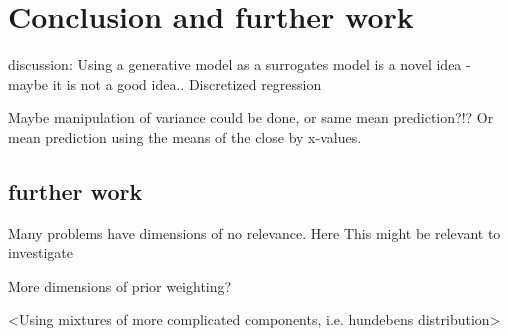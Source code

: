\chapter{Conclusion and further work}

discussion: Using a generative model as a surrogates model is a novel idea - maybe it is not a good
idea.. 
Discretized regression

Maybe manipulation of variance could be done, or same mean prediction?!? Or 
mean prediction using the means of the close by x-values. 

\section{further work}
Many problems have dimensions of no relevance. Here This might be relevant to investigate

More dimensions of prior weighting?

<Using mixtures of more complicated components, i.e. hundebens distribution>
 